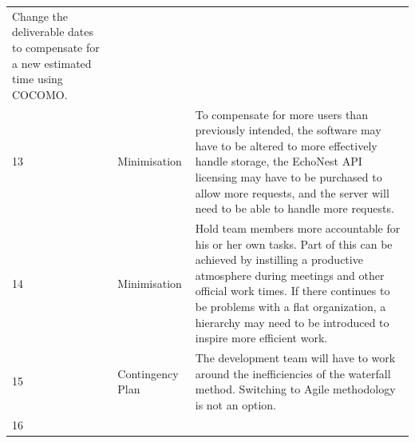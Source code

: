 \documentclass[]{article}
\begin{document}
\begin{longtable}[c]{@{}lll@{}}
\begin{minipage}[t]{0.30\columnwidth}
Change the deliverable dates to compensate for a new estimated time
using COCOMO.
\end{minipage}
\\\addlinespace
\begin{minipage}[t]{0.30\columnwidth}\raggedright
13
\end{minipage} & \begin{minipage}[t]{0.30\columnwidth}\raggedright
Minimisation
\end{minipage} & \begin{minipage}[t]{0.30\columnwidth}\raggedright
To compensate for more users than previously intended, the software may
have to be altered to more effectively handle storage, the EchoNest API
licensing may have to be purchased to allow more requests, and the
server will need to be able to handle more requests.
\end{minipage}
\\\addlinespace
\begin{minipage}[t]{0.30\columnwidth}\raggedright
14
\end{minipage} & \begin{minipage}[t]{0.30\columnwidth}\raggedright
Minimisation
\end{minipage} & \begin{minipage}[t]{0.30\columnwidth}\raggedright
Hold team members more accountable for his or her own tasks. Part of
this can be achieved by instilling a productive atmosphere during
meetings and other official work times. If there continues to be
problems with a flat organization, a hierarchy may need to be introduced
to inspire more efficient work.
\end{minipage}
\\\addlinespace
\begin{minipage}[t]{0.30\columnwidth}\raggedright
15
\end{minipage} & \begin{minipage}[t]{0.30\columnwidth}\raggedright
Contingency Plan
\end{minipage} & \begin{minipage}[t]{0.30\columnwidth}\raggedright
The development team will have to work around the inefficiencies of the
waterfall method. Switching to Agile methodology is not an option.
\end{minipage}
\\\addlinespace
\begin{minipage}[t]{0.30\columnwidth}\raggedright
16
\end{minipage} & \begin{minipage}[t]{0.30\columnwidth}\raggedright

\end{minipage}
\end{longtable}
\end{document}
